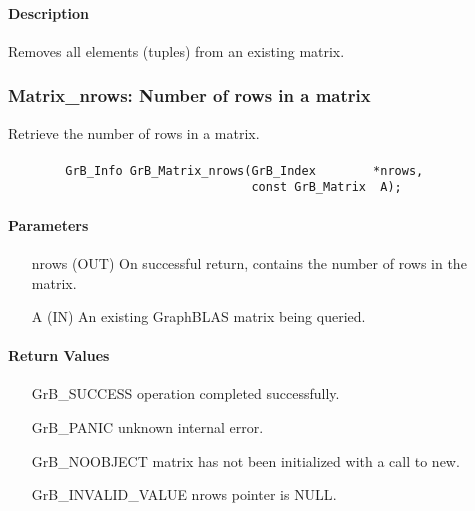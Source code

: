 \paragraph{Description}

Removes all elements (tuples) from an existing matrix.

\subsubsection{{\sf Matrix\_nrows}: Number of rows in a matrix}

Retrieve the number of rows in a matrix.

\paragraph{\syntax}

\begin{verbatim}
        GrB_Info GrB_Matrix_nrows(GrB_Index        *nrows,
                                  const GrB_Matrix  A);
\end{verbatim}

\paragraph{Parameters}

\begin{itemize}[leftmargin=1.1in]
    \item[{\sf nrows}] ({\sf OUT}) On successful return, contains the number of rows in the matrix.
    \item[{\sf A}] ({\sf IN}) An existing GraphBLAS matrix being queried.
\end{itemize}


\paragraph{Return Values}

\begin{itemize}[leftmargin=2.1in]
\item[{\sf GrB\_SUCCESS}]   operation completed successfully.
\item[{\sf GrB\_PANIC}]     unknown internal error.
\item[{\sf GrB\_NOOBJECT}]  matrix has not been initialized with a call to {\sf new}.
\item[{\sf GrB\_INVALID\_VALUE}]    {\sf nrows} pointer is {\sf NULL}.
\end{itemize}

